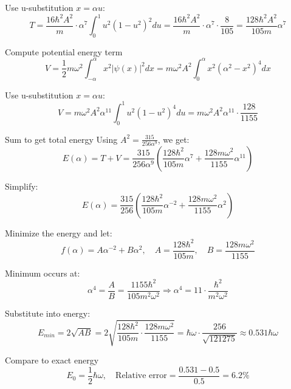 \documentclass[12pt]{article}
\begin{document}
        Use u-substitution \( x = \alpha u \):
        \[
            T = \frac{16\hbar^2 A^2}{m} \cdot \alpha^7 \int_0^1 u^2 (1 - u^2)^2 du
            = \frac{16\hbar^2 A^2}{m} \cdot \alpha^7 \cdot \frac{8}{105}
            = \frac{128 \hbar^2 A^2}{105 m} \alpha^7
        \]
        
        Compute potential energy term
        \[
            V = \frac{1}{2} m\omega^2 \int_{-\alpha}^{\alpha} x^2 |\psi(x)|^2 dx = m\omega^2 A^2 \int_0^\alpha x^2 (\alpha^2 - x^2)^4 dx
        \]
        
        Use u-substitution \( x = \alpha u \):
        \[
            V = m\omega^2 A^2 \alpha^{11} \int_0^1 u^2 (1 - u^2)^4 du
            = m\omega^2 A^2 \alpha^{11} \cdot \frac{128}{1155}
        \]
        
        Sum to get total energy
        Using \( A^2 = \frac{315}{256 \alpha^9} \), we get:
        \[
            E(\alpha) = T + V = \frac{315}{256 \alpha^9} \left( \frac{128 \hbar^2}{105 m} \alpha^7 + \frac{128 m \omega^2}{1155} \alpha^{11} \right)
        \]
        
        Simplify:
        \[
            E(\alpha) = \frac{315}{256} \left( \frac{128 \hbar^2}{105 m} \alpha^{-2} + \frac{128 m \omega^2}{1155} \alpha^2 \right)
        \]
                
        Minimize the energy and let:
        \[
            f(\alpha) = A \alpha^{-2} + B \alpha^2, \quad
            A = \frac{128 \hbar^2}{105 m}, \quad
            B = \frac{128 m \omega^2}{1155}
        \]
        
        Minimum occurs at:
        \[
            \alpha^4 = \frac{A}{B} = \frac{1155 \hbar^2}{105 m^2 \omega^2}
            \Rightarrow \alpha^4 = 11 \cdot \frac{\hbar^2}{m^2 \omega^2}
        \]
        
        Substitute into energy:
        \[
            E_{min} = 2 \sqrt{AB} = 2 \sqrt{ \frac{128 \hbar^2}{105 m} \cdot \frac{128 m \omega^2}{1155} }
            = \hbar \omega \cdot \frac{256}{\sqrt{121275}} \approx 0.531 \hbar \omega
        \]
        
        Compare to exact energy
        \[
            E_0 = \frac{1}{2} \hbar \omega, \quad
            \text{Relative error} = \frac{0.531 - 0.5}{0.5} = \boxed{6.2\%}
        \]
\end{document}
